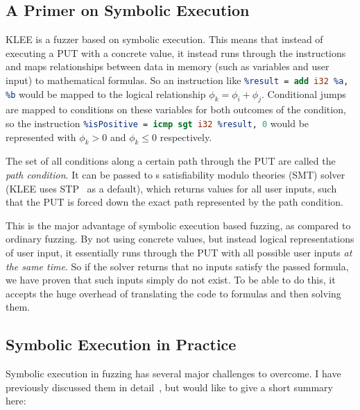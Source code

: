 \documentclass{article}
\let\savedCite=\cite
\renewcommand{\cite}{\unskip~\savedCite}
\begin{document}
\subsection{A Primer on Symbolic Execution}
KLEE is a fuzzer based on symbolic execution. This means that instead of executing a PUT with a concrete value, it instead runs through the instructions and maps relationships between data in memory (such as variables and user input) to mathematical formulas. So an instruction like \lstinline[language=llvm]{%result = add i32 %a, %b} would be mapped to the logical relationship $\phi_k=\phi_i+\phi_j$. Conditional jumps are mapped to conditions on these variables for both outcomes of the condition, so the instruction \lstinline[language=llvm]{%isPositive = icmp sgt i32 %result, 0} would be represented with $\phi_k>0$ and $\phi_k\le0$ respectively.

The set of all conditions along a certain path through the PUT are called the \textit{path condition}. It can be passed to s satisfiability modulo theories (SMT) solver (KLEE uses STP\cite{STP} as a default), which returns values for all user inputs, such that the PUT is forced down the exact path represented by the path condition.

This is the major advantage of symbolic execution based fuzzing, as compared to ordinary fuzzing. By not using concrete values, but instead logical representations of user input, it essentially runs through the PUT with all possible user inputs \textit{at the same time}. So if the solver returns that no inputs satisfy the passed formula, we have proven that such inputs simply do not exist. To be able to do this, it accepts the huge overhead of translating the code to formulas and then solving them.

\subsection{Symbolic Execution in Practice}
\label{SymbexPractice}
Symbolic execution in fuzzing has several major challenges to overcome. I have previously discussed them in detail\cite{EVA}, but would like to give a short summary here:
\end{document}
